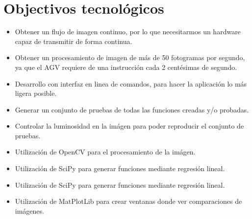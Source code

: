 \section{Objectivos tecnológicos}
\begin{itemize}
	\item Obtener un flujo de imagen continuo, por lo que necesitarmos un hardware capaz de transmitir  de forma continua.
	
	\item Obtener un procesamiento de imagen de más de 50 fotogramas por segundo, ya que el AGV requiere de una instrucción cada 2 centésimas de segundo.
	
	\item Desarrollo con interfaz en linea de comandos, para hacer la aplicación lo más ligera posible.
	
	\item Generar un conjunto de pruebas de todas las funciones creadas y/o probadas.
	
	\item Controlar la luminosidad en la imágen para poder reproducir el conjunto de pruebas.
	
	\item Utilización de OpenCV para el procesamiento de la imágen.
	
	\item Utilización de SciPy para generar funciones mediante regresión lineal.
	
	\item Utilización de SciPy para generar funciones mediante regresión lineal. 
	
	\item Utilización de MatPlotLib para crear ventanas donde ver comparaciones de imágenes.
\end{itemize}
